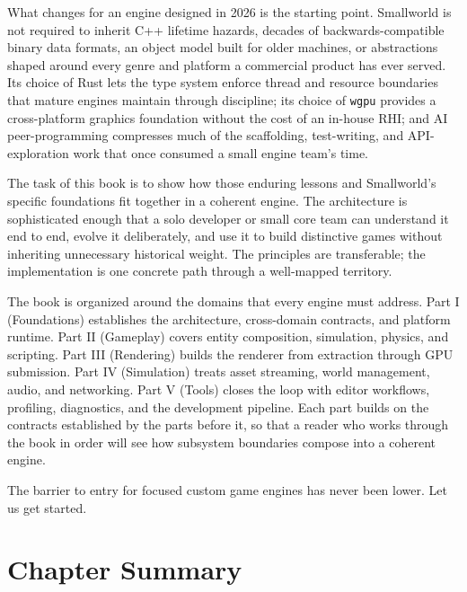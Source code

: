 \documentclass[
  11pt,
  letterpaper,
  DIV=11,
  numbers=noendperiod,
  twoside,
  open=right]{scrreprt}
\begin{document}
What changes for an engine designed in 2026 is the starting point.
Smallworld is not required to inherit C++ lifetime hazards, decades of
backwards-compatible binary data formats, an object model built for
older machines, or abstractions shaped around every genre and platform a
commercial product has ever served. Its choice of Rust lets the type
system enforce thread and resource boundaries that mature engines
maintain through discipline; its choice of \texttt{wgpu} provides a
cross-platform graphics foundation without the cost of an in-house RHI;
and AI peer-programming compresses much of the scaffolding,
test-writing, and API-exploration work that once consumed a small engine
team's time.

The task of this book is to show how those enduring lessons and
Smallworld's specific foundations fit together in a coherent engine. The
architecture is sophisticated enough that a solo developer or small core
team can understand it end to end, evolve it deliberately, and use it to
build distinctive games without inheriting unnecessary historical
weight. The principles are transferable; the implementation is one
concrete path through a well-mapped territory.

The book is organized around the domains that every engine must address.
Part I (Foundations) establishes the architecture, cross-domain
contracts, and platform runtime. Part II (Gameplay) covers entity
composition, simulation, physics, and scripting. Part III (Rendering)
builds the renderer from extraction through GPU submission. Part IV
(Simulation) treats asset streaming, world management, audio, and
networking. Part V (Tools) closes the loop with editor workflows,
profiling, diagnostics, and the development pipeline. Each part builds
on the contracts established by the parts before it, so that a reader
who works through the book in order will see how subsystem boundaries
compose into a coherent engine.

The barrier to entry for focused custom game engines has never been
lower. Let us get started.

\section*{Chapter Summary}\label{chapter-summary}

\end{document}
